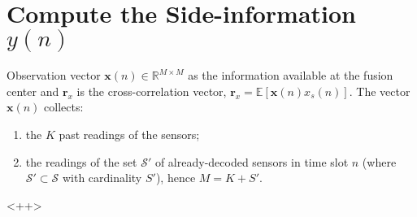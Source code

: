 \section{Compute the Side-information $y(n)$}
Observation vector $\mathbf{x}(n) \in \mathbb{R}^{M\times M}$ as the information available at the fusion center and $\mathbf{r}_x$ is the cross-correlation vector, $\mathbf{r}_x = \mathbb{E}[\mathbf{x}(n)x_s(n)]$. The vector $\mathbf{x}(n)$ collects: 
\begin{enumerate}
    \item the $K$ past readings of the sensors;
    \item the readings of the set $\mathcal{S}'$ of already-decoded sensors in time slot $n$ (where $\mathcal{S}' \subset \mathcal{S}$ with cardinality $S'$), hence $M = K+S'$. 
\end{enumerate}<++>
